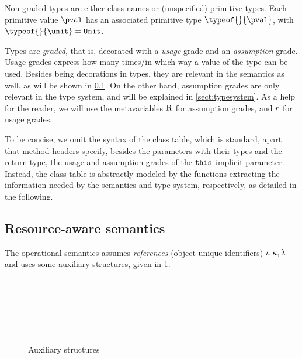 Non-graded types are either class names or (unspecified) primitive types. Each primitive value $\pval$ has an associated primitive type $\typeof{}{\pval}$, with $\typeof{}{\unit}=\Unit$. 

Types are \emph{graded}, that is, decorated with a \emph{usage} grade and an \emph{assumption} grade.
Usage grades express how many times/in which way a value of the type can be used. Besides being decorations in types, they are relevant in the semantics as well, as will be shown in \cref{sect:semantics}. 
On the other hand, assumption grades are only relevant in the type system, and will be explained in \cref{sect:typesystem}.
%
As a help for the reader, we will use the metavariables $\textsc{R}$ for assumption grades, and $r$ for usage grades. 

To be concise, we omit the syntax of the class table, which is standard, apart that method headers specify, besides the parameters with their types and the return type, the usage and assumption grades of the $\texttt{this}$ implicit parameter.  Instead, the class table is abstractly modeled by the functions extracting the information needed by the semantics and type system, respectively, as detailed in the following.

\subsection{Resource-aware semantics}\label{sect:semantics}
The operational semantics assumes \emph{references} (object unique identifiers)  $\iota, \kappa,\lambda$  and uses some auxiliary structures, given in \cref{fig:auxsem}. 
\begin{figure}
\begin{grammatica}
\\
\\
\\
\\
\\
\end{grammatica}
\caption{Auxiliary structures}
\label{fig:auxsem}
\end{figure}

